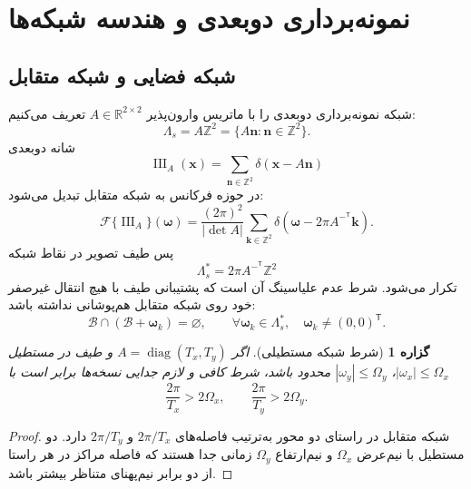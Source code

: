 \documentclass[12pt,openany,oneside]{book}
\newtheorem{proposition}{گزاره}[chapter]
\newcommand{\R}{\mathbb{R}}
\newcommand{\Z}{\mathbb{Z}}
\newcommand{\abs}[1]{\left\lvert #1\right\rvert}
\newcommand{\trans}{^{\mathsf T}}
\newcommand{\vect}[1]{\bm{#1}}
\newcommand{\FT}{\mathcal{F}}
\newcommand{\diag}{\operatorname{diag}}
\begin{document}
\section{نمونه‌برداری دوبعدی و هندسه شبکه‌ها}

\subsection{شبکه فضایی و شبکه متقابل}

شبکه نمونه‌برداری دوبعدی را با ماتریس وارون‌پذیر \(A\in\R^{2\times2}\) تعریف می‌کنیم:
\begin{equation}
\Lambda_s=A\Z^2=\{A\vect n:\vect n\in\Z^2\}.
\end{equation}
شانه دوبعدی
\begin{equation}
\operatorname{III}_{A}(\vect x)=\sum_{\vect n\in\Z^2}
\delta(\vect x-A\vect n)
\end{equation}
در حوزه فرکانس به شبکه متقابل تبدیل می‌شود:
\begin{equation}
\FT\{\operatorname{III}_A\}(\vect\omega)
=\frac{(2\pi)^2}{\abs{\det A}}
\sum_{\vect k\in\Z^2}
\delta\!\left(\vect\omega-2\pi A^{-\trans}\vect k\right).
\label{eq:reciprocal-lattice}
\end{equation}
پس طیف تصویر در نقاط شبکه
\begin{equation}
\Lambda_s^*=2\pi A^{-\trans}\Z^2
\end{equation}
تکرار می‌شود. شرط عدم علیاسینگ آن است که پشتیبانی طیف با هیچ انتقال غیرصفر خود روی شبکه
متقابل هم‌پوشانی نداشته باشد:
\begin{equation}
\mathcal B\cap(\mathcal B+\vect\omega_k)=\varnothing,
\qquad \forall \vect\omega_k\in\Lambda_s^*,\quad \vect\omega_k\ne(0,0)^{\mathsf T}.
\label{eq:2d-no-overlap}
\end{equation}

\begin{proposition}[شرط شبکه مستطیلی]
اگر \(A=\diag(T_x,T_y)\) و طیف در مستطیل
\(\abs{\omega_x}\le\Omega_x\)، \(\abs{\omega_y}\le\Omega_y\) محدود باشد،
شرط کافی و لازم جدایی نسخه‌ها برابر است با
\begin{equation}
\frac{2\pi}{T_x}>2\Omega_x,
\qquad
\frac{2\pi}{T_y}>2\Omega_y.
\end{equation}
\end{proposition}

\begin{proof}
شبکه متقابل در راستای دو محور به‌ترتیب فاصله‌های \(2\pi/T_x\) و \(2\pi/T_y\) دارد.
دو مستطیل با نیم‌عرض \(\Omega_x\) و نیم‌ارتفاع \(\Omega_y\) زمانی جدا هستند که فاصله مراکز
در هر راستا از دو برابر نیم‌پهنای متناظر بیشتر باشد.
\end{proof}
\end{document}
